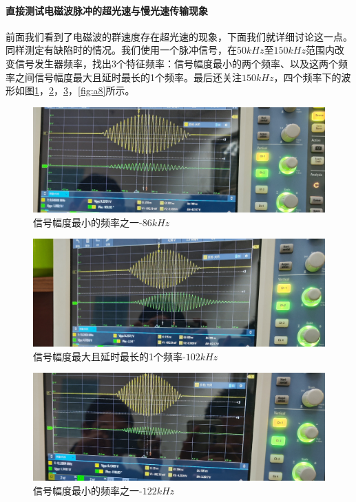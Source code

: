 \documentclass[fleqn,10pt]{SelfArx} %
\begin{document}
\paragraph*{直接测试电磁波脉冲的超光速与慢光速传输现象} 前面我们看到了电磁波的群速度存在超光速的现象，下面我们就详细讨论这一点。同样测定有缺陷时的情况。我们使用一个脉冲信号，在$50kHz$至$150kHz$范围内改变信号发生器频率，找出3个特征频率：信号幅度最小的两个频率、以及这两个频率之间信号幅度最大且延时最长的1个频率。最后还关注$150kHz$，四个频率下的波形如图\ref{fig:a5}，\ref{fig:a6}，\ref{fig:a7}，\ref{fig:a8}所示。
\begin{figure}[htbp]
	\centering
	\includegraphics[width=\linewidth]{pic1.jpg}
	\caption{信号幅度最小的频率之一-$86kHz$}
	\label{fig:a5}
\end{figure}
\begin{figure}[htbp]
	\centering
	\includegraphics[width=\linewidth]{pic2.jpg}
	\caption{信号幅度最大且延时最长的1个频率-$102kHz$}
	\label{fig:a6}
\end{figure}
\begin{figure}[htbp]
	\centering
	\includegraphics[width=\linewidth]{pic3.jpg}
	\caption{信号幅度最小的频率之一-$122kHz$}
	\label{fig:a7}
\end{figure}
\end{document}
